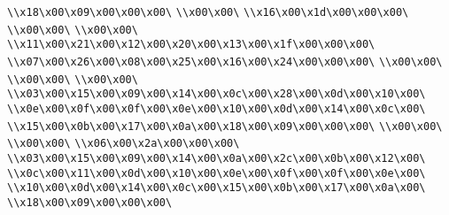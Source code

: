 \verb|\\x18\x00\x09\x00\x00\x00\|\newline
\verb|\\x00\x00\|\newline
\verb|\\x16\x00\x1d\x00\x00\x00\|\newline
\verb|\\x00\x00\|\newline
\verb|\\x00\x00\|\newline
\verb|\\x11\x00\x21\x00\x12\x00\x20\x00\x13\x00\x1f\x00\x00\x00\|\newline
\verb|\\x07\x00\x26\x00\x08\x00\x25\x00\x16\x00\x24\x00\x00\x00\|\newline
\verb|\\x00\x00\|\newline
\verb|\\x00\x00\|\newline
\verb|\\x00\x00\|\newline
\verb|\\x03\x00\x15\x00\x09\x00\x14\x00\x0c\x00\x28\x00\x0d\x00\x10\x00\|\newline
\verb|\\x0e\x00\x0f\x00\x0f\x00\x0e\x00\x10\x00\x0d\x00\x14\x00\x0c\x00\|\newline
\verb|\\x15\x00\x0b\x00\x17\x00\x0a\x00\x18\x00\x09\x00\x00\x00\|\newline
\verb|\\x00\x00\|\newline
\verb|\\x00\x00\|\newline
\verb|\\x06\x00\x2a\x00\x00\x00\|\newline
\verb|\\x03\x00\x15\x00\x09\x00\x14\x00\x0a\x00\x2c\x00\x0b\x00\x12\x00\|\newline
\verb|\\x0c\x00\x11\x00\x0d\x00\x10\x00\x0e\x00\x0f\x00\x0f\x00\x0e\x00\|\newline
\verb|\\x10\x00\x0d\x00\x14\x00\x0c\x00\x15\x00\x0b\x00\x17\x00\x0a\x00\|\newline
\verb|\\x18\x00\x09\x00\x00\x00\|\newline
